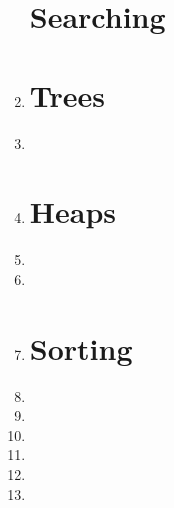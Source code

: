 \documentclass[11pt]{article}
\begin{document}
\begin{enumerate}
\newpage
\section*{Searching}
	\item 

\vspace{1in}
\section*{Trees}
	\item 

\newpage
	\item 

\newpage
\section*{Heaps}
	\item 

	\item 

	\item 

\newpage
\section*{Sorting}
	\item 

	\item 

	\item 

	\item 

	\item 

\newpage
	\item 

\end{enumerate}
\end{document}
